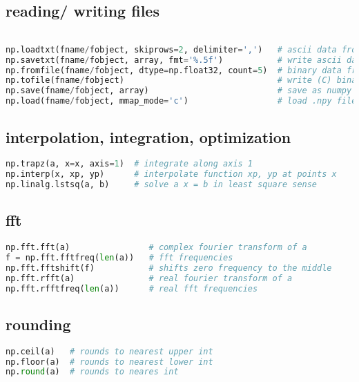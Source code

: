\subsection{reading/ writing files}\label{reading-writing-files}

\begin{lstlisting}[language=Python]

np.loadtxt(fname/fobject, skiprows=2, delimiter=',')   # ascii data from file
np.savetxt(fname/fobject, array, fmt='%.5f')           # write ascii data
np.fromfile(fname/fobject, dtype=np.float32, count=5)  # binary data from file
np.tofile(fname/fobject)                               # write (C) binary data
np.save(fname/fobject, array)                          # save as numpy binary (.npy)
np.load(fname/fobject, mmap_mode='c')                  # load .npy file (memory mapped)
\end{lstlisting}

\subsection{interpolation, integration,
optimization}\label{interpolation-integration-optimization}

\begin{lstlisting}[language=Python]
np.trapz(a, x=x, axis=1)  # integrate along axis 1
np.interp(x, xp, yp)      # interpolate function xp, yp at points x
np.linalg.lstsq(a, b)     # solve a x = b in least square sense
\end{lstlisting}

\subsection{fft}\label{fft}

\begin{lstlisting}[language=Python]
np.fft.fft(a)                # complex fourier transform of a
f = np.fft.fftfreq(len(a))   # fft frequencies
np.fft.fftshift(f)           # shifts zero frequency to the middle
np.fft.rfft(a)               # real fourier transform of a
np.fft.rfftfreq(len(a))      # real fft frequencies
\end{lstlisting}

\subsection{rounding}\label{rounding}

\begin{lstlisting}[language=Python]
np.ceil(a)   # rounds to nearest upper int
np.floor(a)  # rounds to nearest lower int
np.round(a)  # rounds to neares int
\end{lstlisting}

